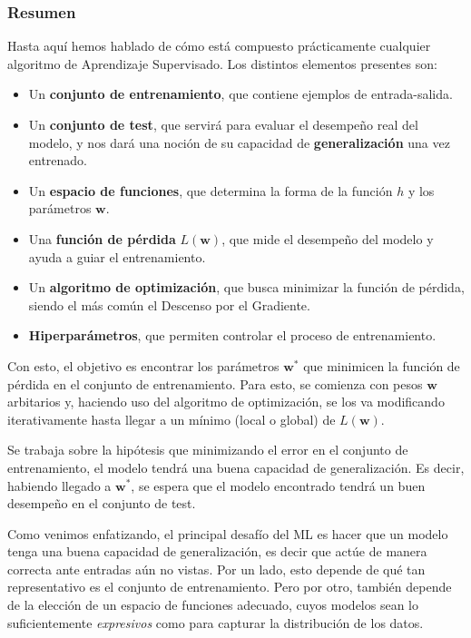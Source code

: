 \documentclass[../../main.tex]{subfiles}
\begin{document}
\subsubsection{Resumen}
Hasta aquí hemos hablado de cómo está compuesto prácticamente cualquier algoritmo de
Aprendizaje Supervisado. Los distintos elementos presentes son:
\begin{itemize}[noitemsep]
    \item Un \textbf{conjunto de entrenamiento}, que contiene ejemplos de entrada-salida.
    \item Un \textbf{conjunto de test}, que servirá para evaluar el desempeño real del modelo,
    y nos dará una noción de su capacidad de \textbf{generalización} una vez entrenado.
    \item Un \textbf{espacio de funciones}, que determina la forma de la función \(h\) y los
    parámetros \(\bm{w}\).
    \item Una \textbf{función de pérdida} \(L(\bm{w})\), que mide el desempeño del modelo
    y ayuda a guiar el entrenamiento.
    \item Un \textbf{algoritmo de optimización}, que busca minimizar la función de pérdida,
    siendo el más común el Descenso por el Gradiente.
    \item \textbf{Hiperparámetros}, que permiten controlar el proceso de entrenamiento.
\end{itemize}

Con esto, el objetivo es encontrar los parámetros \(\bm{w}^*\) que minimicen la función de
pérdida en el conjunto de entrenamiento. Para esto, se comienza con pesos \(\bm{w}\)
arbitarios y, haciendo uso del algoritmo de optimización, se los va modificando iterativamente
hasta llegar a un mínimo (local o global) de \(L(\bm{w})\).

Se trabaja sobre la hipótesis que minimizando el error en el conjunto de entrenamiento, el
modelo tendrá una buena capacidad de generalización. Es decir, habiendo llegado a
\(\bm{w}^*\), se espera que el modelo encontrado tendrá un buen desempeño en el
conjunto de test.

\bigskip
Como venimos enfatizando, el principal desafío del ML es hacer que un modelo tenga una
buena capacidad de generalización, es decir que actúe de manera correcta ante entradas aún
no vistas. Por un lado, esto depende de qué tan representativo es el conjunto de
entrenamiento. Pero por otro, también depende de la elección de un espacio de
funciones adecuado, cuyos modelos sean lo suficientemente \textit{expresivos} como para
capturar la distribución de los datos.
\end{document}
